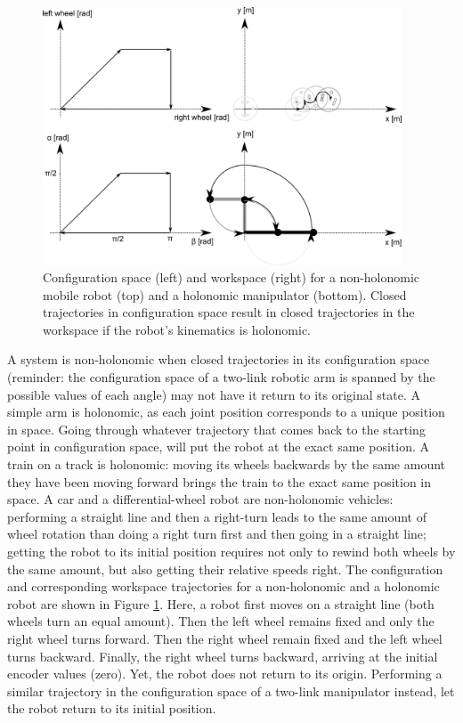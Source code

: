 \begin{figure}[htb!]
	\centering
		\includegraphics[width=0.95\textwidth]{figs/holonomy.png}
	\caption{Configuration space (left) and workspace (right) for a non-holonomic mobile robot (top) and a holonomic manipulator (bottom). Closed trajectories in configuration space result in closed trajectories in the workspace if the robot's kinematics is holonomic.}
	\label{fig:holonomy}
\end{figure}

A system is non-holonomic when closed trajectories in its configuration space (reminder: the configuration space of a two-link robotic arm is spanned by the possible values of each angle) may not have it return to its original state.  A simple arm is holonomic, as each joint position corresponds to a unique position in space. Going through whatever trajectory that comes back to the starting point in configuration space, will put the robot at the exact same position. A train on  a track is holonomic: moving its wheels backwards by the same amount they have been moving forward brings the train to the exact same position in space. A car and a differential-wheel robot are non-holonomic vehicles: performing a straight line and then a right-turn leads to the same amount of wheel rotation than doing a right turn first and then going in a straight line; getting the robot to its initial position requires not only to rewind both wheels by the same amount, but also getting their relative speeds right. The configuration and corresponding workspace trajectories for a non-holonomic and a holonomic robot are shown in Figure \ref{fig:holonomy}. Here, a robot first moves on a straight line (both wheels turn an equal amount). Then the left wheel remains fixed and only the right wheel turns forward. Then the right wheel remain fixed and the left wheel turns backward. Finally, the right wheel turns backward, arriving at the initial encoder values (zero). Yet, the robot does not return to its origin. Performing a similar trajectory in the configuration space of a two-link manipulator instead, let the robot return to its initial position. 

